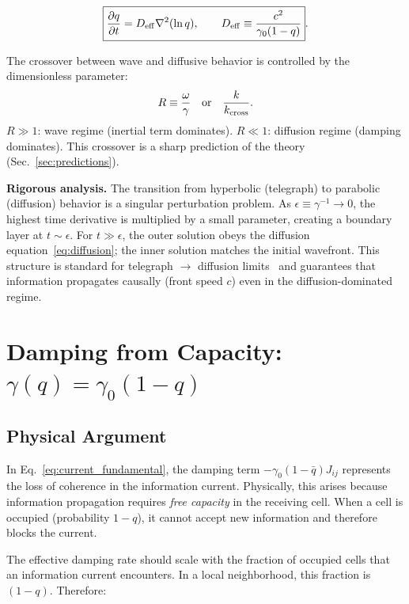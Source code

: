 \documentclass[aps,prd,twocolumn,showpacs,superscriptaddress,preprintnumbers]{revtex4-2}
\begin{document}
\begin{equation}
\boxed{\frac{\partial q}{\partial t} = D_{\rm eff}\nabla^2(\ln q), \qquad D_{\rm eff} \equiv \frac{c^2}{\gamma_0(1-q)}}.
\label{eq:diffusion}
\end{equation}

The crossover between wave and diffusive behavior is controlled by the dimensionless parameter:
\begin{equation}
R \equiv \frac{\omega}{\gamma} \quad\text{or}\quad \frac{k}{k_{\rm cross}}.
\end{equation}
$R\gg1$: wave regime (inertial term dominates). $R\ll1$: diffusion regime (damping dominates).
This crossover is a sharp prediction of the theory (Sec.~\ref{sec:predictions}).

\textbf{Rigorous analysis.}
The transition from hyperbolic (telegraph) to parabolic (diffusion) behavior is a singular perturbation problem.
As $\epsilon\equiv\gamma^{-1}\to0$, the highest time derivative is multiplied by a small parameter, creating a boundary layer at $t\sim\epsilon$.
For $t\gg\epsilon$, the outer solution obeys the diffusion equation~\eqref{eq:diffusion}; the inner solution matches the initial wavefront.
This structure is standard for telegraph $\to$ diffusion limits~\cite{Jou:2010} and guarantees that information propagates causally (front speed $c$) even in the diffusion-dominated regime.

\section{Damping from Capacity: $\gamma(q)=\gamma_0(1-q)$}
\label{sec:gamma}

\subsection{Physical Argument}

In Eq.~\eqref{eq:current_fundamental}, the damping term $-\gamma_0(1-\bar{q})J_{ij}$ represents the loss of coherence in the information current.
Physically, this arises because information propagation requires \emph{free capacity} in the receiving cell.
When a cell is occupied (probability $1-q$), it cannot accept new information and therefore blocks the current.

The effective damping rate should scale with the fraction of occupied cells that an information current encounters.
In a local neighborhood, this fraction is $(1-q)$.
Therefore:
\end{document}
